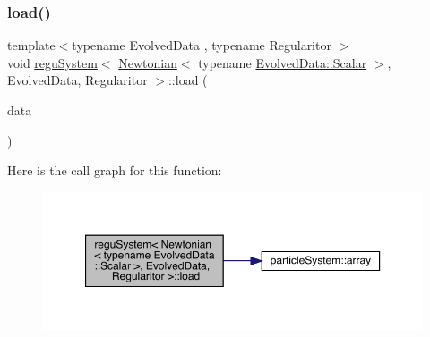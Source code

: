 \subsubsection{\texorpdfstring{load()}{load()}}
{\footnotesize\ttfamily template$<$typename Evolved\+Data , typename Regularitor $>$ \\
void \mbox{\hyperlink{classregu_system}{regu\+System}}$<$ \mbox{\hyperlink{class_newtonian}{Newtonian}}$<$ typename \mbox{\hyperlink{classregu_system_aca8ee2c387943164ee3ea68370fc3ac0}{Evolved\+Data\+::\+Scalar}} $>$, Evolved\+Data, Regularitor $>$\+::load (\begin{DoxyParamCaption}\item[{\mbox{\hyperlink{classregu_system_3_01_newtonian_3_01typename_01_evolved_data_1_1_scalar_01_4_00_01_evolved_data_00_01_regularitor_01_4_a26da8a1ed92e5aced3615da524ef37b3}{Plain\+Array}} \&}]{data }\end{DoxyParamCaption})}

Here is the call graph for this function\+:
\nopagebreak
\begin{figure}[H]
\begin{center}
\leavevmode
\includegraphics[width=350pt]{classregu_system_3_01_newtonian_3_01typename_01_evolved_data_1_1_scalar_01_4_00_01_evolved_data_00_01_regularitor_01_4_a968643b9deaa2a579a025652238fdc75_cgraph}
\end{center}
\end{figure}
\mbox{\label{classregu_system_3_01_newtonian_3_01typename_01_evolved_data_1_1_scalar_01_4_00_01_evolved_data_00_01_regularitor_01_4_a0cfd66a24e4b23158a6450510c40ab31}} 
